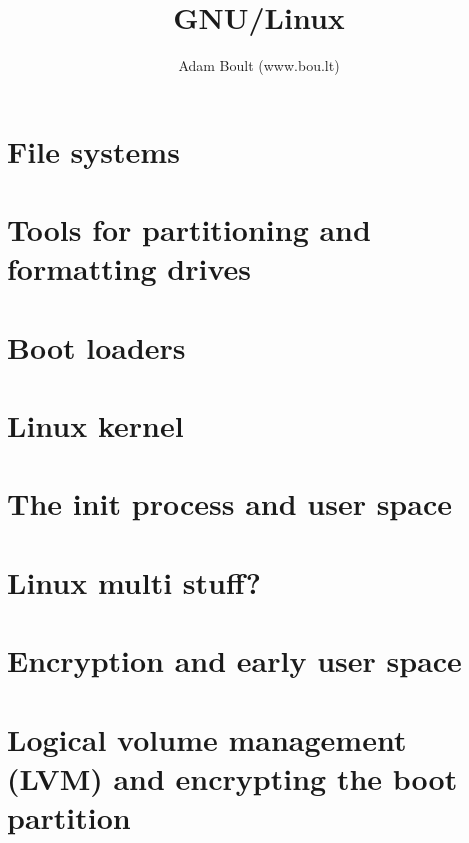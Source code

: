 \documentclass[oneside]{book}
\begin{document}
\author{Adam Boult (www.bou.lt)}
\title{GNU/Linux}
\maketitle

\setcounter{tocdepth}{0}
\tableofcontents



\part{File systems}




\part{Tools for partitioning and formatting drives}



\part{Boot loaders}



\part{Linux kernel}



\part{The init process and user space}





\part{Linux multi stuff?}




\part{Encryption and early user space}




\part{Logical volume management (LVM) and encrypting the boot partition}

\end{document}
